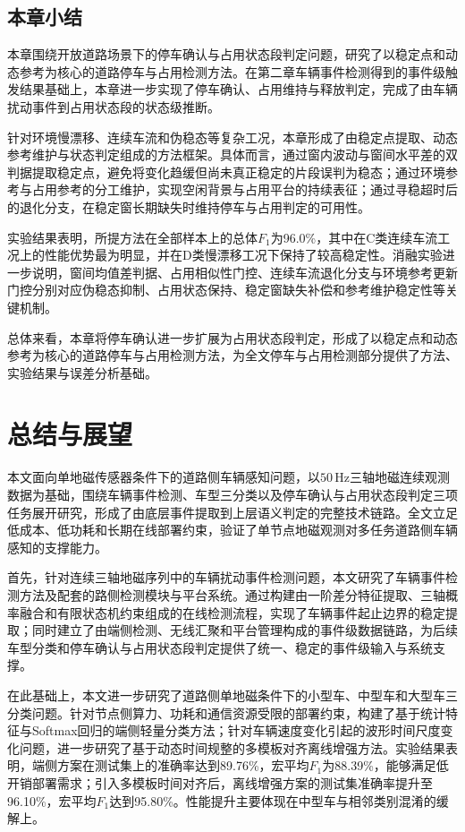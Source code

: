 \documentclass{xdupgthesis}
\begin{document}
\section{本章小结}
\label{sec:ch4_summary}

本章围绕开放道路场景下的停车确认与占用状态段判定问题，研究了以稳定点和动态参考为核心的道路停车与占用检测方法。在第二章车辆事件检测得到的事件级触发结果基础上，本章进一步实现了停车确认、占用维持与释放判定，完成了由车辆扰动事件到占用状态段的状态级推断。

针对环境慢漂移、连续车流和伪稳态等复杂工况，本章形成了由稳定点提取、动态参考维护与状态判定组成的方法框架。具体而言，通过窗内波动与窗间水平差的双判据提取稳定点，避免将变化趋缓但尚未真正稳定的片段误判为稳态；通过环境参考与占用参考的分工维护，实现空闲背景与占用平台的持续表征；通过寻稳超时后的退化分支，在稳定窗长期缺失时维持停车与占用判定的可用性。

实验结果表明，所提方法在全部样本上的总体$F_1$为96.0\%，其中在C类连续车流工况上的性能优势最为明显，并在D类慢漂移工况下保持了较高稳定性。消融实验进一步说明，窗间均值差判据、占用相似性门控、连续车流退化分支与环境参考更新门控分别对应伪稳态抑制、占用状态保持、稳定窗缺失补偿和参考维护稳定性等关键机制。

总体来看，本章将停车确认进一步扩展为占用状态段判定，形成了以稳定点和动态参考为核心的道路停车与占用检测方法，为全文停车与占用检测部分提供了方法、实验结果与误差分析基础。




\chapter{总结与展望}

本文面向单地磁传感器条件下的道路侧车辆感知问题，以$50\,\mathrm{Hz}$三轴地磁连续观测数据为基础，围绕车辆事件检测、车型三分类以及停车确认与占用状态段判定三项任务展开研究，形成了由底层事件提取到上层语义判定的完整技术链路。全文立足低成本、低功耗和长期在线部署约束，验证了单节点地磁观测对多任务道路侧车辆感知的支撑能力。

首先，针对连续三轴地磁序列中的车辆扰动事件检测问题，本文研究了车辆事件检测方法及配套的路侧检测模块与平台系统。通过构建由一阶差分特征提取、三轴概率融合和有限状态机约束组成的在线检测流程，实现了车辆事件起止边界的稳定提取；同时建立了由端侧检测、无线汇聚和平台管理构成的事件级数据链路，为后续车型分类和停车确认与占用状态段判定提供了统一、稳定的事件级输入与系统支撑。

在此基础上，本文进一步研究了道路侧单地磁条件下的小型车、中型车和大型车三分类问题。针对节点侧算力、功耗和通信资源受限的部署约束，构建了基于统计特征与Softmax回归的端侧轻量分类方法；针对车辆速度变化引起的波形时间尺度变化问题，进一步研究了基于动态时间规整的多模板对齐离线增强方法。实验结果表明，端侧方案在测试集上的准确率达到89.76\%，宏平均$F_1$为88.39\%，能够满足低开销部署需求；引入多模板时间对齐后，离线增强方案的测试集准确率提升至96.10\%，宏平均$F_1$达到95.80\%。性能提升主要体现在中型车与相邻类别混淆的缓解上。
\end{document}
